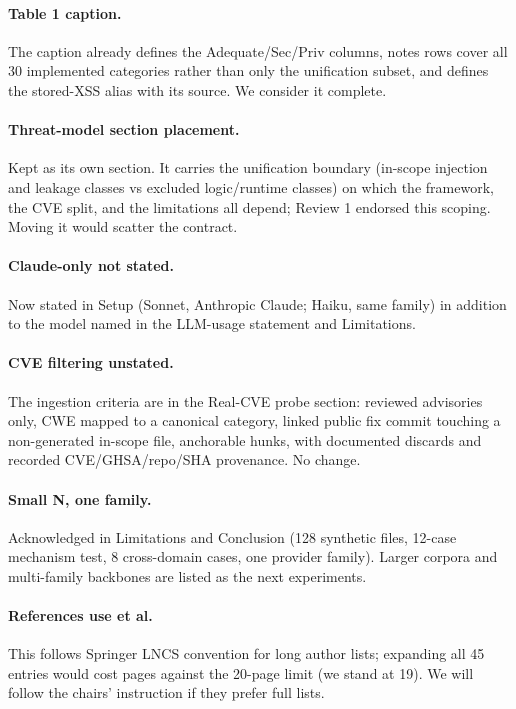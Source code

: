 \documentclass[11pt,a4paper]{article}
\begin{document}
\paragraph{Table 1 caption.} The caption already defines the Adequate/Sec/Priv columns, notes rows cover all 30 implemented categories rather than only the unification subset, and defines the stored-XSS alias with its source. We consider it complete.

\paragraph{Threat-model section placement.} Kept as its own section. It carries the unification boundary (in-scope injection and leakage classes vs excluded logic/runtime classes) on which the framework, the CVE split, and the limitations all depend; Review 1 endorsed this scoping. Moving it would scatter the contract.

\paragraph{Claude-only not stated.} Now stated in Setup (Sonnet, Anthropic Claude; Haiku, same family) in addition to the model named in the LLM-usage statement and Limitations.

\paragraph{CVE filtering unstated.} The ingestion criteria are in the Real-CVE probe section: reviewed advisories only, CWE mapped to a canonical category, linked public fix commit touching a non-generated in-scope file, anchorable hunks, with documented discards and recorded CVE/GHSA/repo/SHA provenance. No change.

\paragraph{Small N, one family.} Acknowledged in Limitations and Conclusion (128 synthetic files, 12-case mechanism test, 8 cross-domain cases, one provider family). Larger corpora and multi-family backbones are listed as the next experiments.

\paragraph{References use et al.} This follows Springer LNCS convention for long author lists; expanding all 45 entries would cost pages against the 20-page limit (we stand at 19). We will follow the chairs' instruction if they prefer full lists.
\end{document}
